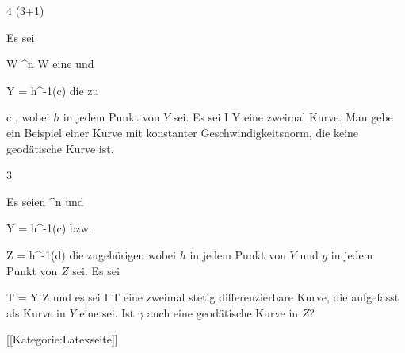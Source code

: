 {4 (3+1)}
{

Es sei

\mavergleichskette
{\vergleichskette
{ W
}
{ \subseteq }{ \R^n
}
{  }{
}
{    }{
}
{   }{
}
}
{}{}{}
 { W } { \R
} {}
eine
und

\mavergleichskette
{\vergleichskette
{ Y
}
{ = }{ h^{-1}(c)
}
{  }{
}
{    }{
}
{   }{
}
}
{}{}{}
die
zu

\mavergleichskette
{\vergleichskette
{ c
}
{ \in }{ \R
}
{  }{
}
{    }{
}
{   }{
}
}
{}{}{,}
wobei $h$ in jedem Punkt von $Y$
sei. Es sei
\maabbdisp {\gamma} { I } { Y
} {}
eine zweimal
Kurve.
 {Man gebe ein Beispiel einer Kurve mit konstanter Geschwindigkeitsnorm, die keine geodätische Kurve ist.
}

}
{} {}

{3}
{

Es seien
 {\R^n } { \R
} {}
und

\mavergleichskette
{\vergleichskette
{ Y
}
{ = }{ h^{-1}(c)
}
{  }{
}
{    }{
}
{   }{
}
}
{}{}{}
bzw.

\mavergleichskette
{\vergleichskette
{ Z
}
{ = }{ h^{-1}(d)
}
{  }{
}
{    }{
}
{   }{
}
}
{}{}{}
die zugehörigen
wobei $h$ in jedem Punkt von $Y$ und $g$ in jedem Punkt von $Z$
sei. Es sei

\mavergleichskette
{\vergleichskette
{ T
}
{ = }{ Y \cap Z
}
{  }{
}
{    }{
}
{   }{
}
}
{}{}{}
und es sei
\maabbdisp {\gamma} { I } { T
} {}
eine zweimal stetig differenzierbare Kurve, die aufgefasst als Kurve in $Y$ eine
sei. Ist  $\gamma$ auch eine geodätische Kurve in $Z$?

}
{} {}

 [[Kategorie:Latexseite]]
